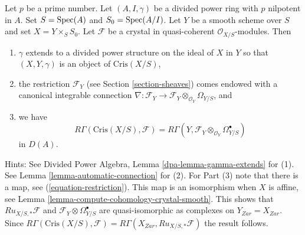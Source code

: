 \begin{remark}[Comparison]
\label{remark-comparison}
Let $p$ be a prime number. Let $(A, I, \gamma)$ be a divided power
ring with $p$ nilpotent in $A$. Set $S = \mathop{\mathrm{Spec}}(A)$ and
$S_0 = \mathop{\mathrm{Spec}}(A/I)$. Let $Y$ be a smooth scheme over $S$ and set
$X = Y \times_S S_0$. Let
$\mathcal{F}$ be a crystal in quasi-coherent $\mathcal{O}_{X/S}$-modules.
Then
\begin{enumerate}
\item $\gamma$ extends to a divided power structure on the ideal
of $X$ in $Y$ so that $(X, Y, \gamma)$ is an object of $\text{Cris}(X/S)$,
\item the restriction $\mathcal{F}_Y$ (see Section \ref{section-sheaves})
comes endowed with a canonical integrable connection
$\nabla : \mathcal{F}_Y \to
\mathcal{F}_Y \otimes_{\mathcal{O}_Y} \Omega_{Y/S}$, and
\item we have
$$
R\Gamma(\text{Cris}(X/S), \mathcal{F}) =
R\Gamma(Y, \mathcal{F}_Y \otimes_{\mathcal{O}_Y} \Omega^\bullet_{Y/S})
$$
in $D(A)$.
\end{enumerate}
Hints: See Divided Power Algebra, Lemma \ref{dpa-lemma-gamma-extends} for (1).
See Lemma \ref{lemma-automatic-connection} for (2).
For Part (3) note that there is a map, see
(\ref{equation-restriction}). This map is an isomorphism when
$X$ is affine, see
Lemma \ref{lemma-compute-cohomology-crystal-smooth}.
This shows that $Ru_{X/S, *}\mathcal{F}$ and
$\mathcal{F}_Y \otimes \Omega^\bullet_{Y/S}$ are quasi-isomorphic
as complexes on $Y_{Zar} = X_{Zar}$.
Since $R\Gamma(\text{Cris}(X/S), \mathcal{F}) =
R\Gamma(X_{Zar}, Ru_{X/S, *}\mathcal{F})$ the result follows.
\end{remark}

